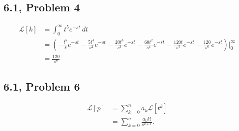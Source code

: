 \documentclass[8pt]{mypackage}
\begin{document}
\subsection{6.1, Problem 4}%
\begin{align*}
  \mathcal{L}\left[k\right] &= \int_{0}^{\infty} t^5e^{-st}\:dt\\
                            &= \left(-\frac{t^5}{s}e^{-st} - \frac{5t^4}{s^2}e^{-st} - \frac{20t^3}{s^3}e^{-st} - \frac{60t^2}{s^4}e^{-st} - \frac{120t}{s^5}e^{-st} - \frac{120}{s^6}e^{-st}\right)\Bigr\vert_{0}^{\infty}\\
                            &= \frac{120}{s^{6}}
\end{align*}

\subsection{6.1, Problem 6}%
\begin{align*}
  \mathcal{L}\left[p\right] &= \sum_{k=0}^{n}a_k\mathcal{L}\left[t^k\right]\\
                            &= \sum_{k=0}^{n}\frac{a_k k!}{s^{k+1}}.
\end{align*}
\end{document}
